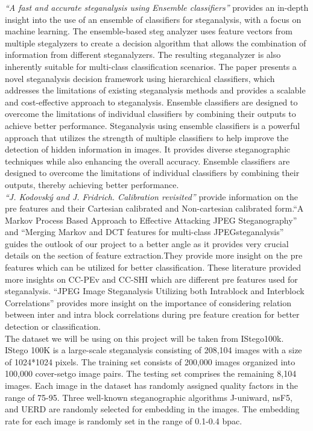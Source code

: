 \textit{``A fast and accurate steganalysis using Ensemble classifiers''}\cite{6} provides an in-depth insight into the use of an ensemble of classifiers for steganalysis, with a focus on machine learning. The ensemble-based steg analyzer uses feature vectors from multiple stegalyzers to create a decision algorithm that allows the combination of information from different steganalyzers. The resulting steganalyzer is also inherently suitable for multi-class classification scenarios. The paper presents a novel steganalysis decision framework using hierarchical classifiers, which addresses the limitations of existing steganalysis methods and provides a scalable and cost-effective approach to steganalysis. Ensemble classifiers are designed to overcome the limitations of individual classifiers by combining their outputs to achieve better performance. Steganalysis using ensemble classifiers is a powerful approach that utilizes the strength of multiple classifiers to help improve the detection of hidden information in images. It provides diverse steganographic techniques while also enhancing the overall accuracy. Ensemble classifiers are designed to overcome the limitations of individual classifiers by combining their outputs, thereby achieving better performance.\\
\textit{``J. Kodovský and J. Fridrich. Calibration revisited''}\cite{9} provide information on the pre features and their Cartesian calibrated and Non-cartesian calibrated form.``A Markov Process Based Approach to Effective Attacking JPEG Steganography''\cite{10} and ``Merging Markov and DCT features for multi-class JPEGsteganalysis''\cite{11}  guides the outlook of our project to a better angle as it provides very crucial details on the section of feature extraction.They provide more insight on the pre features which can be utilized for better classification. These literature provided more insights on CC-PEv and CC-SHI which are different pre features used for steganalysis. “JPEG Image Steganalysis Utilizing both Intrablock and Interblock Correlations”  provides more insight on the importance of considering relation between inter and intra block correlations during pre feature creation for better detection or classification. \\
The dataset we will be using on this project will be taken from IStego100k\cite{7}. IStego 100K is a large-scale steganalysis consisting of 208,104 images with a size of 1024*1024 pixels. The training set consists of 200,000 images organized into 100,000 cover-setgo image pairs. The testing set comprises the remaining 8,104 images. Each image in the dataset has randomly assigned quality factors in the range of 75-95. Three well-known steganographic algorithms J-uniward, nsF5, and UERD\cite{}\cite{12}\cite{13} are randomly selected for embedding in the images. The embedding rate for each image is randomly set in the range of 0.1-0.4 bpac.\\ 

